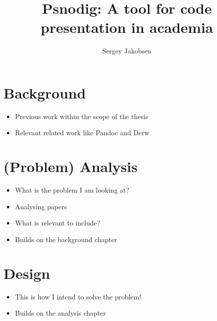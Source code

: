 \documentclass[twoside, openright, a4paper,  UKenglish]{report}
\begin{document}
\title{Psnodig: A tool for code presentation in academia}
\author{Sergey Jakobsen}
\uiomasterfp[program={Informatics: Programming and System Architecture}, binding, colour=green] %
\setcounter{page}{1}




\renewcommand*\contentsname{Contents}
\tableofcontents




\chapter{Background} %
\begin{itemize}
    \item Previous work within the scope of the thesis
    \item Relevant related work like Pandoc and Derw
\end{itemize}


\chapter{(Problem) Analysis}
\begin{itemize}
    \item What is the problem I am looking at?
    \item Analysing papers
    \item What is relevant to include?
    \item Builds on the background chapter
\end{itemize}

\chapter{Design}
\begin{itemize}
    \item This is how I intend to solve the problem! %
    \item Builds on the analysis chapter
\end{itemize}

\end{document}
